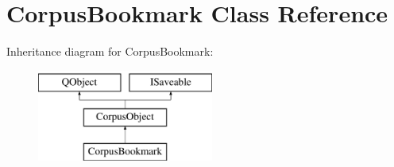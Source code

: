 \hypertarget{class_corpus_bookmark}{}\section{Corpus\+Bookmark Class Reference}
\label{class_corpus_bookmark}
Inheritance diagram for Corpus\+Bookmark\+:\begin{figure}[H]
\begin{center}
\leavevmode
\includegraphics[height=3.000000cm]{class_corpus_bookmark}
\end{center}
\end{figure}
